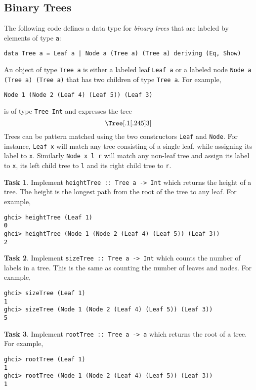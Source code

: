 \documentclass{article}[12pt]
\theoremstyle{definition}
\newtheorem{task}{Task}
\begin{document}
\subsection{Binary Trees}
The following code defines a data type for \emph{binary trees} that are labeled by elements of type \verb|a|:
\begin{verbatim}
data Tree a = Leaf a | Node a (Tree a) (Tree a) deriving (Eq, Show)
\end{verbatim}
An object of type \verb|Tree a| is either a labeled leaf \verb|Leaf a| or a labeled node \verb|Node a (Tree a) (Tree a)| that has two children of type \verb|Tree a|. For example,
\begin{verbatim}
Node 1 (Node 2 (Leaf 4) (Leaf 5)) (Leaf 3)
\end{verbatim}
is of type \verb|Tree Int| and expresses the tree
$$\Tree [.1  [.2 4 5 ] 3 ] $$
Trees can be pattern matched using the two constructors \verb|Leaf| and \verb|Node|. For instance, \verb|Leaf x| will match any tree consisting of a single leaf, while assigning its label to \verb|x|. Similarly \verb|Node x l r| will match any non-leaf tree and assign its label to \verb|x|, its left child tree to \verb|l| and its right child tree to \verb|r|.

\begin{task}
    Implement \verb|heightTree :: Tree a -> Int| which returns the height of a tree. The height is the longest path from the root of the tree to any leaf. For example,
    \begin{verbatim}
ghci> heightTree (Leaf 1)
0
ghci> heightTree (Node 1 (Node 2 (Leaf 4) (Leaf 5)) (Leaf 3))
2 \end{verbatim}
\end{task}

\begin{task}
    Implement \verb|sizeTree :: Tree a -> Int| which counts the number of labels in a tree. This is the same as counting the number of leaves and nodes. For example,
    \begin{verbatim}
ghci> sizeTree (Leaf 1)
1
ghci> sizeTree (Node 1 (Node 2 (Leaf 4) (Leaf 5)) (Leaf 3))
5\end{verbatim}
\end{task}

\begin{task}
    Implement \verb|rootTree :: Tree a -> a| which returns the root of a tree. For example,
    \begin{verbatim}
ghci> rootTree (Leaf 1)
1
ghci> rootTree (Node 1 (Node 2 (Leaf 4) (Leaf 5)) (Leaf 3))
1 \end{verbatim}
\end{task}
\end{document}
